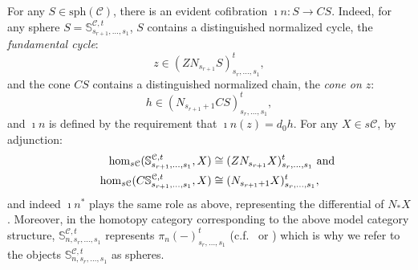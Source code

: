 \documentclass[11pt]{amsart} \renewcommand{\baselinestretch}{1.2}
\theoremstyle{plain}
\numberwithin{equation}{section} %
\theoremstyle{plain}
\numberwithin{equation}{chapter} %
\newcommand{\DASH}{\mathrm{-}}
\renewcommand{\to}{\longrightarrow}
\newcommand{\calc}{\mathcal{C}}
\newcommand{\spheres}[1]{\mathrm{sph}(#1)}
\newcommand{\citeBOX}[2][]{\cite[\mbox{#1}]{#2}}
\newcommand{\bdyinc}{\imath n}
\begin{document}
\begin{Pi-algebras and cohomology algebras}
For any $S\in\spheres{\calc}$, there is an evident cofibration $\bdyinc :S\to CS$. Indeed, for any sphere $S=\mathbb{S}^{\calc,t}_{s_{r+1},\ldots,s_1}$, $S$ contains  a distinguished normalized cycle, the \emph{fundamental cycle}:
\[z\in (ZN_{s_{r+1}}S)_{s_r,\ldots,s_1}^t,\]
and the cone $CS$ contains a distinguished normalized chain, the \emph{cone on $z$}:
\[h\in (N_{s_{r+1}+1}CS)_{s_r,\ldots,s_1}^t,\]
and $\bdyinc$ is defined by the requirement that $\bdyinc(z)=d_0h$.
For any $X\in s\calc$, by adjunction:
\begin{alignat*}{2}
\hom_{s\calc}(\mathbb{S}^{\calc,t}_{s_{r+1},\ldots,s_1},X)&\cong (ZN_{s_{r+1}}X)_{s_r,\ldots,s_1}^t\makebox[0cm][l]{ and}\\
\hom_{s\calc}(C\mathbb{S}^{\calc,t}_{s_{r+1},\ldots,s_1},X)&\cong (N_{s_{r+1}+1}X)_{s_r,\ldots,s_1}^t,
\end{alignat*}
and indeed $\bdyinc^*$ plays the same role as above, representing the differential of $N_*X$. Moreover, in the homotopy category corresponding to the above model category structure, $\mathbb{S}^{\calc,t}_{n,s_r,\ldots,s_1}$ represents $\pi_n(\DASH)^t_{s_r,\ldots,s_1}$ (c.f.\ \citeBOX[\S1]{MR1089001} or \citeBOX[\S3.1.1]{Blanc_Stover-Groth_SS.pdf}) which is why  we  refer to the objects $\mathbb{S}^{\calc,t}_{n,s_r,\ldots,s_1}$ as spheres.


\end{Pi-algebras and cohomology algebras}
\end{document}
